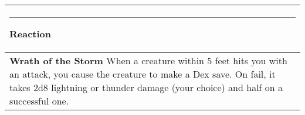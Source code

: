 \documentclass[twocolumn]{article}
\begin{document}
\\
\noindent\begin{tabular}{|m{3.1in}|}
\hline
\rule{1.25in}{0pt}Reaction\\
\hline
\textbf{Wrath of the Storm} When a creature within 5 feet hits you with an attack, you cause the creature to make a Dex save. On fail, it takes 2d8 lightning or thunder damage (your choice) and half on a successful one. \\
\hline
\end{tabular}
\end{document}
